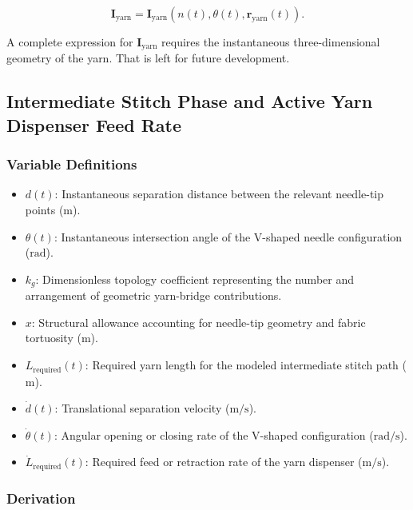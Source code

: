 \documentclass[12pt, a4paper]{article}
\begin{document}
\begin{equation}
\mathbf{I}_{\text{yarn}}
=
\mathbf{I}_{\text{yarn}}
\left(
n(t),
\theta(t),
\mathbf{r}_{\text{yarn}}(t)
\right).
\end{equation}

A complete expression for $\mathbf{I}_{\text{yarn}}$ requires the instantaneous three-dimensional geometry of the yarn. That is left for future development.

\subsection{Intermediate Stitch Phase and Active Yarn Dispenser Feed Rate}

\subsubsection*{Variable Definitions}

\begin{itemize}
\item $d(t)$: Instantaneous separation distance between the relevant needle-tip points ($\mathrm{m}$).
\item $\theta(t)$: Instantaneous intersection angle of the V-shaped needle configuration ($\mathrm{rad}$).
\item $k_g$: Dimensionless topology coefficient representing the number and arrangement of geometric yarn-bridge contributions.
\item $x$: Structural allowance accounting for needle-tip geometry and fabric tortuosity ($\mathrm{m}$).
\item $L_{\text{required}}(t)$: Required yarn length for the modeled intermediate stitch path ($\mathrm{m}$).
\item $\dot{d}(t)$: Translational separation velocity ($\mathrm{m/s}$).
\item $\dot{\theta}(t)$: Angular opening or closing rate of the V-shaped configuration ($\mathrm{rad/s}$).
\item $\dot{L}_{\text{required}}(t)$: Required feed or retraction rate of the yarn dispenser ($\mathrm{m/s}$).
\end{itemize}

\subsubsection*{Derivation}
\end{document}
